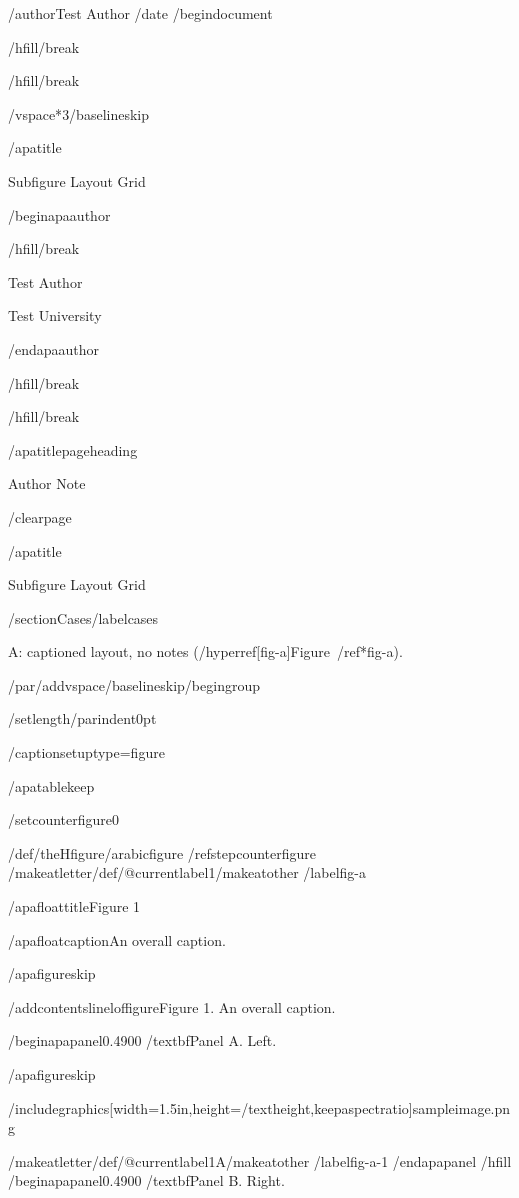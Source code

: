 /author{Test Author}
/date{}
/begin{document}


/hfill/break

/hfill/break

/vspace*{3/baselineskip}

/apatitle{

Subfigure Layout Grid

}

/begin{apaauthor}

/hfill/break

Test Author

Test University

/end{apaauthor}

/hfill/break

/hfill/break

/apatitlepageheading{

Author Note

}

/clearpage

/apatitle{

Subfigure Layout Grid

}

/section{Cases}/label{cases}

A: captioned layout, no notes (/hyperref[fig-a]{Figure~/ref*{fig-a}}).

/par/addvspace{/baselineskip}/begingroup

/setlength{/parindent}{0pt}

/captionsetup{type=figure}

/apatablekeep

/setcounter{figure}{0}

/def/theHfigure{/arabic{figure}}%
/refstepcounter{figure}%
/makeatletter/def/@currentlabel{1}/makeatother%
/label{fig-a}

/apafloattitle{Figure 1}

/apafloatcaption{An overall caption.}

/apafigureskip

/addcontentsline{lof}{figure}{Figure 1. An overall caption.}

/begin{apapanel}{0.4900}%
/textbf{Panel A}. Left.

/apafigureskip

/includegraphics[width=1.5in,height=/textheight,keepaspectratio]{sampleimage.png}

/makeatletter/def/@currentlabel{1A}/makeatother%
/label{fig-a-1}
/end{apapanel}%
/hfill
/begin{apapanel}{0.4900}%
/textbf{Panel B}. Right.

